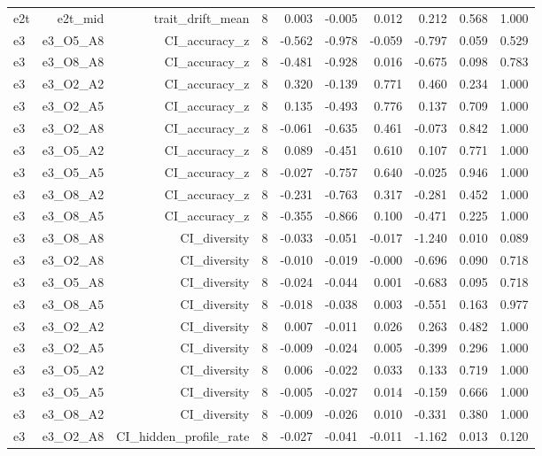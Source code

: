 \documentclass[11pt]{article}
\begin{document}
\begin{landscape}
\begin{longtable}{@{}lrrrrrrrrr@{}}
e2t & e2t\_mid & trait\_drift\_mean & 8 & 0.003 & -0.005 & 0.012 & 0.212 & 0.568 & 1.000 \\
e3 & e3\_O5\_A8 & CI\_accuracy\_z & 8 & -0.562 & -0.978 & -0.059 & -0.797 & 0.059 & 0.529 \\
e3 & e3\_O8\_A8 & CI\_accuracy\_z & 8 & -0.481 & -0.928 & 0.016 & -0.675 & 0.098 & 0.783 \\
e3 & e3\_O2\_A2 & CI\_accuracy\_z & 8 & 0.320 & -0.139 & 0.771 & 0.460 & 0.234 & 1.000 \\
e3 & e3\_O2\_A5 & CI\_accuracy\_z & 8 & 0.135 & -0.493 & 0.776 & 0.137 & 0.709 & 1.000 \\
e3 & e3\_O2\_A8 & CI\_accuracy\_z & 8 & -0.061 & -0.635 & 0.461 & -0.073 & 0.842 & 1.000 \\
e3 & e3\_O5\_A2 & CI\_accuracy\_z & 8 & 0.089 & -0.451 & 0.610 & 0.107 & 0.771 & 1.000 \\
e3 & e3\_O5\_A5 & CI\_accuracy\_z & 8 & -0.027 & -0.757 & 0.640 & -0.025 & 0.946 & 1.000 \\
e3 & e3\_O8\_A2 & CI\_accuracy\_z & 8 & -0.231 & -0.763 & 0.317 & -0.281 & 0.452 & 1.000 \\
e3 & e3\_O8\_A5 & CI\_accuracy\_z & 8 & -0.355 & -0.866 & 0.100 & -0.471 & 0.225 & 1.000 \\
e3 & e3\_O8\_A8 & CI\_diversity & 8 & -0.033 & -0.051 & -0.017 & -1.240 & 0.010 & 0.089 \\
e3 & e3\_O2\_A8 & CI\_diversity & 8 & -0.010 & -0.019 & -0.000 & -0.696 & 0.090 & 0.718 \\
e3 & e3\_O5\_A8 & CI\_diversity & 8 & -0.024 & -0.044 & 0.001 & -0.683 & 0.095 & 0.718 \\
e3 & e3\_O8\_A5 & CI\_diversity & 8 & -0.018 & -0.038 & 0.003 & -0.551 & 0.163 & 0.977 \\
e3 & e3\_O2\_A2 & CI\_diversity & 8 & 0.007 & -0.011 & 0.026 & 0.263 & 0.482 & 1.000 \\
e3 & e3\_O2\_A5 & CI\_diversity & 8 & -0.009 & -0.024 & 0.005 & -0.399 & 0.296 & 1.000 \\
e3 & e3\_O5\_A2 & CI\_diversity & 8 & 0.006 & -0.022 & 0.033 & 0.133 & 0.719 & 1.000 \\
e3 & e3\_O5\_A5 & CI\_diversity & 8 & -0.005 & -0.027 & 0.014 & -0.159 & 0.666 & 1.000 \\
e3 & e3\_O8\_A2 & CI\_diversity & 8 & -0.009 & -0.026 & 0.010 & -0.331 & 0.380 & 1.000 \\
e3 & e3\_O2\_A8 & CI\_hidden\_profile\_rate & 8 & -0.027 & -0.041 & -0.011 & -1.162 & 0.013 & 0.120 \\

\end{longtable}
\end{landscape}
\end{document}
